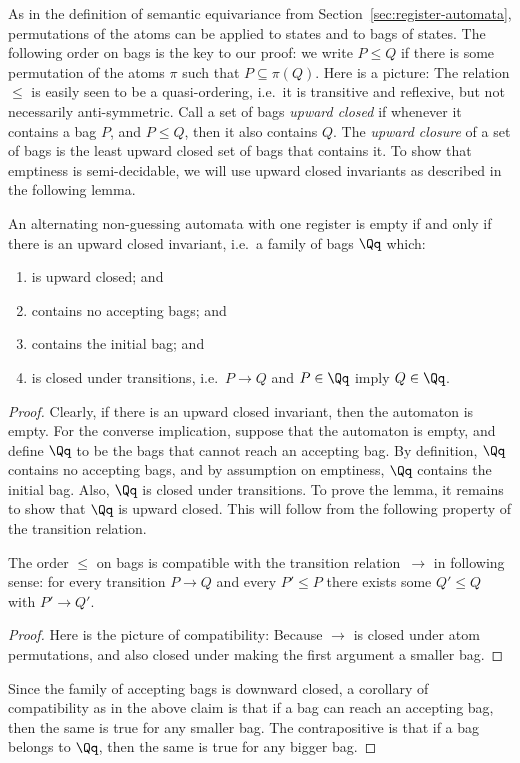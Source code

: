  
 As in the definition of semantic equivariance from Section~\ref{sec:register-automata}, permutations of the atoms can be applied to states and to bags of states. The following order on bags is the key to our proof: we write $P \le Q$ if there is some permutation of the atoms $\pi$ such that $P \subseteq \pi(Q)$. Here is a picture:
 The relation $\le$ is easily seen to be a quasi-ordering, i.e.~it is transitive and reflexive, but not necessarily anti-symmetric. 
 Call a set of bags \emph{upward closed} if whenever it contains a bag $P$, and $P \le Q$, then it also contains $Q$. The \emph{upward closure} of a set of bags is the least upward closed set of bags that contains it. 
 To show that emptiness is semi-decidable, we will use upward closed invariants as described in the following lemma.
 \begin{lemma}\label{lem:upward-closed-invariant}
An alternating non-guessing automata with one register is empty if and only if there is an upward closed invariant, i.e.~a family of bags $\Qq$ which:
\begin{enumerate}
	\item is upward closed; and
	\item \label{it:no-accepting-bags} contains no accepting bags; and
	\item contains the initial bag; and
	\item is closed under transitions, i.e.~$P \to Q$ and $P \in \Qq$ imply $Q \in \Qq$.
\end{enumerate}
\end{lemma}
\begin{proof}
	Clearly, if there is an upward closed invariant, then the automaton is empty. For the converse implication, suppose that the automaton is empty, and define $\Qq$ to be the bags that cannot reach an accepting bag. By definition, $\Qq$ contains no accepting bags, and by assumption on emptiness, $\Qq$ contains the initial bag. Also, $\Qq$ is closed under transitions. To prove the lemma, it remains to show that $\Qq$ is upward closed. This will follow from the following property of the transition relation. 
	
	\begin{claim}\label{lem:wts} The order $\le$ on bags is compatible with the transition relation~$\to$ in following sense: for every transition $P \to Q$ and every $P' \le P$ there exists some $Q' \le Q$ with $P' \to Q'$.
	\end{claim}
	\begin{proof}
	Here is the picture of compatibility: 
	Because $\to$ is closed under atom permutations, and also closed under making the first argument a smaller bag.
	\end{proof}

	Since the family of accepting bags is downward closed, a corollary of compatibility as in the above claim is that if a bag can reach an accepting bag, then the same is true for any smaller bag. The contrapositive is that if a bag belongs to $\Qq$, then the same is true for any bigger bag. 
\end{proof}

